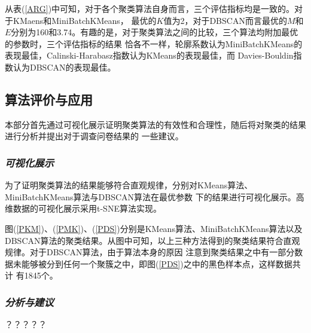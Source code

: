 \documentclass{acm_proc_article-sp}
\begin{document}
从表(\ref{ARG})中可知，对于各个聚类算法自身而言，三个评估指标均是一致的。对于KMaens和MiniBatchKMeans，
最优的$K$值为2，对于DBSCAN而言最优的$M$和$E$分别为160和3.74。有趣的是，对于聚类算法之间的比较，三个算法均附加最优的参数时，三个评估指标的结果
恰各不一样，轮廓系数认为MiniBatchKMeans的表现最佳，Calinski-Harabasz指数认为KMeans的表现最佳，而
Davies-Bouldin指数认为DBSCAN的表现最佳。




\subsection{\textsf{算法评价与应用}}
本部分首先通过可视化展示证明聚类算法的有效性和合理性，随后将对聚类的结果进行分析并提出对于调查问卷结果的
一些建议。

\subsubsection{\textit{可视化展示}}
为了证明聚类算法的结果能够符合直观规律，分别对KMeans算法、MiniBatchKMeans算法与DBSCAN算法在最优参数
下的结果进行可视化展示。高维数据的可视化展示采用t-SNE算法实现。



图(\ref{PKM})、(\ref{PMK})、(\ref{PDS})分别是KMeans算法、MiniBatchKMeans算法以及
DBSCAN算法的聚类结果。从图中可知，以上三种方法得到的聚类结果符合直观规律。对于DBSCAN算法，由于算法本身的原因
注意到聚类结果之中有一部分数据未能够被分到任何一个聚簇之中，即图(\ref{PDS})之中的黑色样本点，这样数据共计
有1845个。

\subsubsection{\textit{分析与建议}}
？？？？？



%
%
\newpage
\appendix
\end{document}

